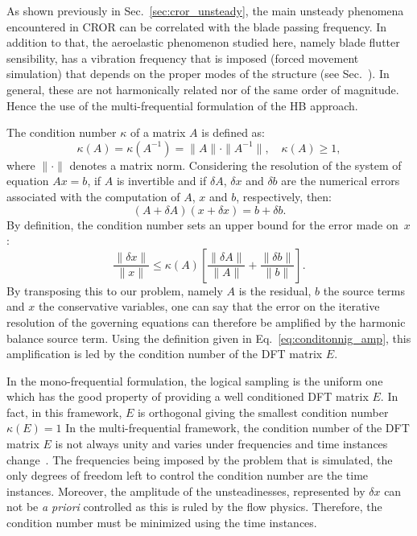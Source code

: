 
As shown previously in Sec.~\ref{sec:cror_unsteady}, the main unsteady
phenomena encountered in CROR can be correlated with the blade passing
frequency.
In addition to that, the aeroelastic phenomenon
studied here, namely blade flutter sensibility, has a vibration frequency that
is imposed (forced movement simulation) that depends on the proper modes
of the structure (see Sec.~).
In general, these are not harmonically related nor
of the same order of magnitude. Hence the use of the
multi-frequential formulation of the HB approach. 

The condition number $\kappa$ of a matrix $A$ is defined as:
\begin{equation}
  \kappa (A) = \kappa (A^{-1}) = \| A \| \cdot \| A^{-1} \|, \quad
    \kappa(A) \geq 1,
\end{equation}
where $\| \cdot \|$ denotes a matrix norm. Considering the resolution
of the system of equation
$A x = b$, if $A$ is invertible and if $\delta A$, $\delta x$ and
$\delta b$ are the numerical errors associated with the computation of
$A$, $x$ and $b$, respectively, then:
\begin{equation}
   (A + \delta A)(x + \delta x) = b + \delta b.
   \label{eq:error_reso}
\end{equation}
By definition, the condition number sets an upper bound for 
the error made on~$x$:
\begin{equation}
   \frac{\| \delta x \|}{\| x \|} \leq 
   \kappa(A)\left[\frac{\| \delta A \|}{\| A \|} + 
   \frac{\| \delta b \|}{\| b \|} \right].
   \label{eq:conditonnig_amp}
\end{equation}
By transposing this to our problem, namely $A$ is the residual, 
$b$ the source terms and $x$ the conservative variables, one can say that
the error on the iterative resolution of the governing equations can
therefore be amplified by the harmonic balance source term.
Using the definition given in Eq.~\eqref{eq:conditonnig_amp}, this amplification is
led by the condition number of the DFT matrix $E$. 


In the mono-frequential formulation, the logical sampling is the uniform one
which has the good property of providing
a well conditioned DFT matrix $E$. In fact, in this framework, $E$ is orthogonal giving 
the smallest condition number $\kappa (E) = 1$
In the multi-frequential framework,
the condition number of the DFT matrix $E$ is not always unity and
varies under frequencies and time instances change~\cite{Kundert1988}. 
The frequencies
being imposed by the problem that is simulated,
the only degrees of freedom left to control the condition
number are the time instances. 
Moreover, the amplitude of the unsteadinesses, represented by $\delta x$
can not be \emph{a priori} controlled as this is ruled by the flow physics. 
Therefore, the condition
number must be minimized using the time instances.

